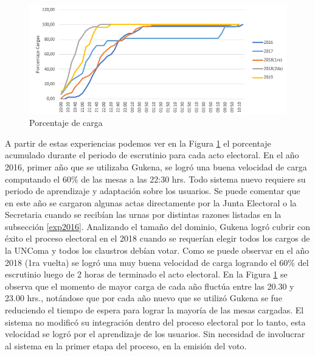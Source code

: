 \begin{figure}[h!]
    \begin{center}
        \includegraphics[width=\textwidth]{img/experienciasPorcCarga.png}
    \end{center}
  \caption{Porcentaje de carga}
  \label{graf:experienciaPorcCarga}
\end{figure}

A partir de estas experiencias podemos ver en la Figura \ref{graf:experienciaPorcCarga} el porcentaje acumulado durante el periodo de escrutinio para cada acto electoral.  \newline
En el año 2016, primer año que se utilizaba Gukena, se logró una buena velocidad de carga computando el 60\% de las mesas a las 22:30 hrs. Todo sistema nuevo requiere su periodo de aprendizaje y adaptación sobre los usuarios. Se puede comentar que en este año se cargaron algunas actas directamente por la Junta Electoral o la Secretaria cuando se recibían las urnas por distintas razones listadas en la subsección \ref{exp2016}. \newline
Analizando el tamaño del dominio, Gukena logró cubrir con éxito el proceso electoral en el 2018 cuando se requerían elegir todos los cargos de la UNComa y todos los claustros debían votar. Como se puede observar en el año 2018 (1ra vuelta) se logró una muy buena velocidad de carga logrando el 60\% del escrutinio luego de 2 horas de terminado el acto electoral.\newline
En la Figura \ref{graf:experienciaPorcCarga} se observa que el momento de mayor carga de cada año fluctúa entre las 20.30 y 23.00 hrs., notándose que por cada año nuevo que se utilizó Gukena se fue reduciendo el tiempo de espera para lograr la mayoría de las mesas cargadas. El sistema no modificó su integración dentro del proceso electoral por lo tanto, esta velocidad se logró por el aprendizaje de los usuarios. Sin necesidad de involucrar al sistema en la primer etapa del proceso, en la emisión del voto.

